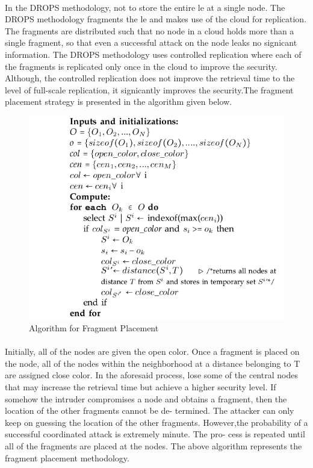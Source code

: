 \paragraph*{}
In the DROPS methodology, not to store the entire le at a single node. The DROPS
methodology fragments the le and makes use of the cloud for replication. The fragments
are distributed such that no node in a cloud holds more than a single fragment, so that even
a successful attack on the node leaks no signicant information. The DROPS methodology
uses controlled replication where each of the fragments is replicated only once in the cloud
to improve the security. Although, the controlled replication does not improve the retrieval
time to the level of full-scale replication, it signicantly improves the security.The fragment placement strategy is presented in
the algorithm given below.
\\
\begin{figure}
	\centering
	\includegraphics[scale=0.5]{placementalgo}
	\caption{Algorithm for Fragment Placement}
\end{figure}

\paragraph*{}

Initially, all of the nodes are given the open color. Once a fragment is placed on the
node, all of the nodes within the neighborhood at a distance belonging to T are assigned
close color. In the aforesaid process, lose some of the central nodes that may increase the
retrieval time but achieve a higher security level. If somehow the intruder compromises
a node and obtains a fragment, then the location of the other fragments cannot be de-
termined. The attacker can only keep on guessing the location of the other fragments.
However,the probability of a successful coordinated attack is extremely minute. The pro-
cess is repeated until all of the fragments are placed at the nodes. The above algorithm
represents the fragment placement methodology.
